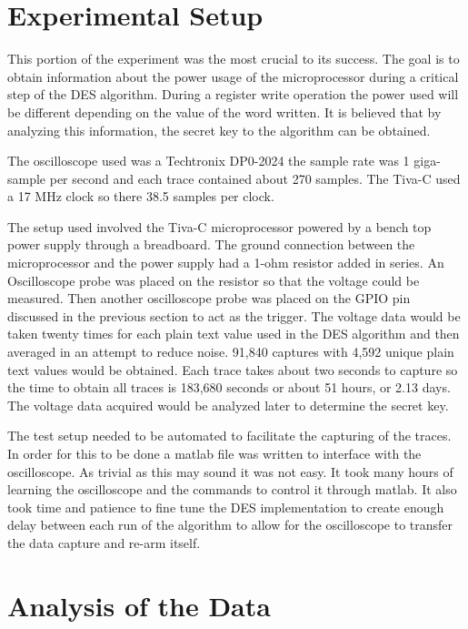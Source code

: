 	

\section{Experimental Setup} \label{sec::expr}
	This portion of the experiment was the most crucial to its success.  The goal is to obtain information about the power usage of the microprocessor during a critical step of the DES algorithm.  During a register write operation the power used will be different depending on the value of the word written.  It is believed that by analyzing this information, the secret key to the algorithm can be obtained.
	
	The oscilloscope used was a Techtronix DP0-2024 the sample rate was 1 giga-sample per second and each trace contained about 270 samples.  The Tiva-C used a 17 MHz clock so there 38.5 samples per clock.
	
	The setup used involved the Tiva-C microprocessor powered by a bench top power supply through a breadboard.  The ground connection between the microprocessor and the power supply had a 1-ohm resistor added in series.  An Oscilloscope probe was placed on the resistor so that the voltage could be measured.  Then another oscilloscope probe was placed on the GPIO pin discussed in the previous section to act as the trigger.  The voltage data would be taken twenty times for each plain text value used in the DES algorithm and then averaged in an attempt to reduce noise.  91,840 captures with 4,592 unique plain text values would be obtained.  Each trace takes about two seconds to capture so the time to obtain all traces is 183,680 seconds or about 51 hours, or 2.13 days.  The voltage data acquired would be analyzed later to determine the secret key.
	
	The test setup needed to be automated to facilitate the capturing of the traces.  In order for this to be done a matlab file was written to interface with the oscilloscope.  As trivial as this may sound it was not easy.  It took many hours of learning the oscilloscope and the commands to control it through matlab.  It also took time and patience to fine tune the DES implementation to create enough delay between each run of the algorithm to allow for the oscilloscope to transfer the data capture and re-arm itself.
	

\section{Analysis of the Data}\label{sec::analysis} 
